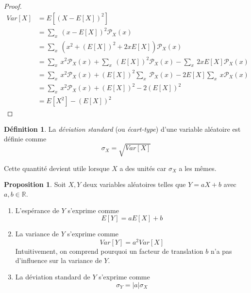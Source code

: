 \documentclass[a4paper,12pt]{report}
\theoremstyle{definition}
\newcommand{\R}{\mathbb{R}}
\renewcommand{\(}{\left(}
\renewcommand{\)}{\right)}
\renewcommand{\P}{\mathcal{P}}
\renewcommand{\d}{\textit}
\newtheorem{defn}[thm]{Définition}
\newtheorem{prop}[thm]{Proposition}
\begin{document}
            \begin{proof}
                \begin{align*}
                    Var[X] &= E[(X-E[X])^2] \\
                    &= \sum_x~(x-E[X])^2\P_X(x) \\
                    &= \sum_x~(x^2+(E[X])^2+2xE[X])\P_X(x) \\
                    &= \sum_x~x^2\P_X(x) + \sum_x~(E[X])^2\P_X(x) - \sum_x~2xE[X]\P_X(x) \\
                    &= \sum_x~x^2\P_{X}(x) + (E[X])^2\sum_x~\P_X(x) - 2E[X]\sum_x~x\P_X(x) \\
                    &= \sum_x~x^2\P_{X}(x) + (E[X])^2 - 2(E[X])^2\\
                    &= E[X^2]-(E[X])^2
                \end{align*}
            \end{proof}
            
            \begin{leftbar}
                \begin{defn}
                    La \d{déviation standard} (ou \d{écart-type}) d'une variable aléatoire est définie comme
                    $$\sigma_X = \sqrt{Var[X]}$$
                \end{defn}
            \end{leftbar}
            Cette quantité devient utile lorsque $X$ a des unités car $\sigma_X$ a les mêmes.
            
            \begin{leftbar}
            \begin{prop}
                Soit $X,Y$ deux variables aléatoires telles que $Y = aX + b$ avec $a,b\in\R$.
                \begin{enumerate}[label=(\roman*)]
                    \item L'espérance de $Y$ s'exprime comme 
                    $$E[Y] = aE[X] + b$$
                    \item La variance de $Y$ s'exprime comme
                    $$Var[Y] = a^2Var[X]$$
                    Intuitivement, on comprend pourquoi un facteur de translation $b$ n'a pas d'influence sur la variance de $Y$.
                    \item La déviation standard de $Y$ s'exprime comme
                    $$\sigma_Y = |a|\sigma_X$$
                \end{enumerate}
            \end{prop}
            \end{leftbar}
            
\end{document}
